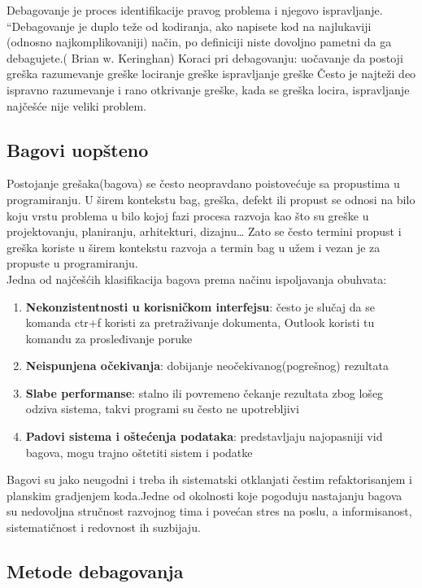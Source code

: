 \documentclass[a4paper]{article}
\begin{document}
Debagovanje je proces identifikacije pravog problema i njegovo ispravljanje.
“Debagovanje je duplo teže od kodiranja, ako napisete kod na najlukaviji (odnosno najkomplikovaniji) način, po definiciji niste dovoljno pametni da ga debagujete.( Brian w. Keringhan)
Koraci pri debagovanju:
uočavanje da postoji greška
razumevanje greške
lociranje greške
ispravljanje greške
Često je najteži deo ispravno razumevanje i rano otkrivanje greške, kada se greška locira, ispravljanje najčešće nije veliki problem.



\subsection{Bagovi uopšteno}
\label{subsec:podnaslov1}

Postojanje grešaka(bagova) se često neopravdano poistovećuje sa propustima u programiranju.
U širem kontekstu bag, greška, defekt ili propust se odnosi na bilo koju vrstu problema u bilo kojoj fazi procesa razvoja kao što su greške u projektovanju, planiranju, arhitekturi, dizajnu…
Zato se često termini propust i greška koriste u širem kontekstu razvoja a termin bag u užem i vezan je za propuste u programiranju.\\
\indent Jedna od najčešćih klasifikacija bagova prema načinu ispoljavanja obuhvata:
\begin{enumerate}
	\item \textbf{Nekonzistentnosti u korisničkom interfejsu}: često je slučaj da se komanda ctr+f koristi za pretraživanje dokumenta, Outlook koristi   
	tu komandu za prosleđivanje poruke
	\item \textbf{Neispunjena očekivanja}: dobijanje neočekivanog(pogrešnog) rezultata
	\item \textbf{Slabe performanse}: stalno ili povremeno čekanje rezultata zbog lošeg odziva sistema, takvi programi su često ne upotrebljivi
	\item \textbf{Padovi sistema i oštećenja podataka}: predstavljaju najopasniji vid bagova, mogu trajno oštetiti sistem i podatke
\end{enumerate}
\indent Bagovi su jako neugodni i treba ih sistematski otklanjati čestim refaktorisanjem i planskim gradjenjem koda.Jedne od okolnosti koje pogoduju nastajanju bagova su nedovoljna stručnost razvojnog tima i povećan stres na poslu, a informisanost, sistematičnost i redovnost ih suzbijaju. 


\subsection{Metode debagovanja}
\label{subsec:podnaslov2}
\end{document}
